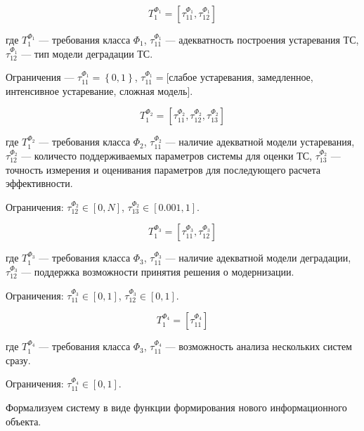 \begin{equation}
    \label{eq:formal_requirements_1}
    T^{\Phi_1}_1=[\tau^{\Phi_1}_{11},\tau^{\Phi_1}_{12}]
\end{equation}

\noindent
где $T^{\Phi_1}_1$ --- требования класса $\Phi_1$,
$\tau^{\Phi_1}_{11}$ --- адекватность построения устаревания ТС,
$\tau^{\Phi_1}_{12}$ --- тип модели деградации ТС.

Ограничения --- $\tau^{\Phi_1}_{11} = \left\{ 0,1 \right\}$,
$\tau^{\Phi_1}_{11} = $[слабое устаревания, замедленное, интенсивное устаревание, сложная модель].


\begin{equation}
    \label{eq:formal_requirements_2}
    T^{\Phi_2}_1=[\tau^{\Phi_2}_{11},\tau^{\Phi_2}_{12},\tau^{\Phi_2}_{13}]
\end{equation}

\noindent
где $T^{\Phi_2}_1$ --- требования класса $\Phi_2$,
$\tau^{\Phi_2}_{11}$ --- наличие адекватной модели устаревания,
$\tau^{\Phi_2}_{12}$ --- количесто поддерживаемых параметров системы для оценки ТС,
$\tau^{\Phi_2}_{13}$ --- точность измерения и оценивания параметров для последующего расчета эффективности.

Ограничения: $\tau^{\Phi_2}_{12} \in [0,N]$,
$\tau^{\Phi_2}_{13} \in [0.001,1]$.

\begin{equation}
    \label{eq:formal_requirements_3}
    T^{\Phi_3}_1=[\tau^{\Phi_3}_{11},\tau^{\Phi_3}_{12}]
\end{equation}

\noindent
где $T^{\Phi_3}_1$ --- требования класса $\Phi_3$,
$\tau^{\Phi_3}_{11}$ --- наличие адекватной модели деградации,
$\tau^{\Phi_3}_{12}$ --- поддержка возможности принятия решения о модернизации.

Ограничения: $\tau^{\Phi_3}_{11} \in [0,1]$,
$\tau^{\Phi_3}_{12} \in [0,1]$.

\begin{equation}
    \label{eq:formal_requirements_4}
    T^{\Phi_4}_1=[\tau^{\Phi_4}_{11}]
\end{equation}

\noindent
где $T^{\Phi_4}_1$ --- требования класса $\Phi_3$,
$\tau^{\Phi_4}_{11}$ --- возможность анализа нескольких систем сразу.

Ограничения: $\tau^{\Phi_4}_{11} \in [0,1]$.

Формализуем систему в виде функции формирования нового информационного объекта.

